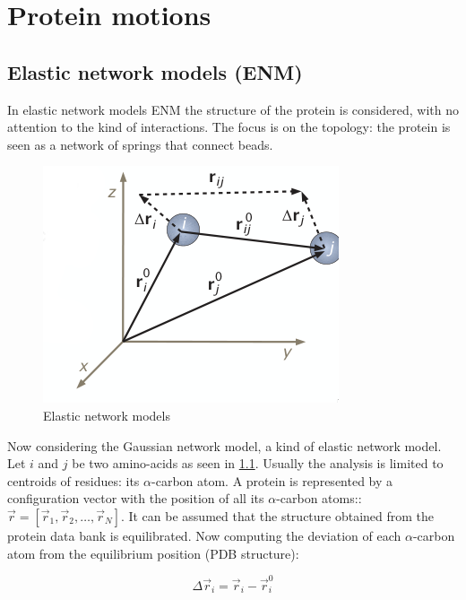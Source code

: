 \graphicspath{{chapters/15/images/}}
\chapter{Protein motions}

\section{Elastic network models (ENM)}
In elastic network models ENM the structure of the protein is considered, with no attention to the kind of interactions.
The focus is on the topology: the protein is seen as a network of springs that connect beads.

\begin{figure}[H]
	\includegraphics[width=\textwidth]{enm-theory}
	\caption{Elastic network models}
	\label{fig:enm-theory}
\end{figure}

Now considering the Gaussian network model, a kind of elastic network model.
Let $i$ and $j$ be two amino-acids as seen in \ref{fig:enm-theory}.
Usually the analysis is limited to centroids of residues: its $\alpha$-carbon atom.
A protein is represented by a configuration vector with the position of all its $\alpha$-carbon atoms:: $\vec{r} = [\vec{r}_1, \vec{r}_2, \dots, \vec{r}_N]$.
It can be assumed that the structure obtained from the protein data bank is equilibrated.
Now computing the deviation of each $\alpha$-carbon atom from the equilibrium position (PDB structure):

$$\Delta\vec{r}_i = \vec{r}_i-\vec{r}_i^0$$


